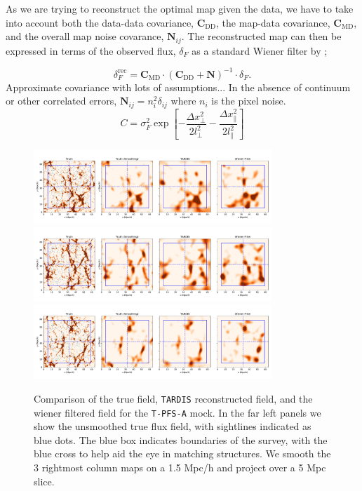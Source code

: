 \documentclass[times]{aastex62}
\begin{document}
As we are trying to reconstruct the optimal map given the data, we have to take into account both the data-data covariance, $\textbf{C}_{\textrm{DD}}$, the map-data covariance, $\textbf{C}_{\textrm{MD}}$, and the overall map noise covarance, $\textbf{N}_{ij}$. The reconstructed map can then be expressed in terms of the observed flux, $\delta_F$ as a standard Wiener filter by ;

\begin{equation}
\delta_F^{\textrm{rec}} = \textbf{C}_{\textrm{MD}} \cdot
(\textbf{C}_{\textrm{DD}} + \textbf{N})^{-1} \cdot \delta_F.
\label{eqn:wiener}
\end{equation}
Approximate covariance with lots of assumptions... In the absence of continuum or other correlated errors, $\textbf{N}_{ij}
= n_i^2 \delta_{ij}$ where $n_i$ is the pixel noise.
\begin{equation}
C = \sigma_F^2 \exp{\left[-\frac{\Delta x_{\perp}^2}{2 l_{\perp}^2}
- \frac{\Delta x_{\parallel}^2}{2 l_{\parallel}^2}
\right]}
\label{eqn:covariance}
\end{equation}




\begin{figure}

  \centering  \includegraphics[trim=0cm 0cm 0cm 0cm,width=0.80\textwidth]{./figs_treepm/wf_comparison/wf_compare_pfs14.pdf}
  \centering  \includegraphics[trim=0cm 0cm 0cm 0cm,width=0.80\textwidth]{./figs_treepm/wf_comparison/wf_compare_pfs64.pdf}
  \centering  \includegraphics[trim=0cm 0cm 0cm 0cm,width=0.80\textwidth]{./figs_treepm/wf_comparison/wf_compare_pfs114.pdf}
    \caption{Comparison of the true field, \texttt{TARDIS} reconstructed field, and the wiener filtered field for the \texttt{T-PFS-A} mock. In the far left panels we show the unsmoothed true flux field, with sightlines indicated as blue dots. The blue box indicates boundaries of the survey, with the blue cross to help aid the eye in matching structures. We smooth the 3 rightmost column maps on a 1.5 Mpc/h and project over a 5 Mpc slice.} 
    \label{fig_wfcompare}
\end{figure}




%

\end{document}
